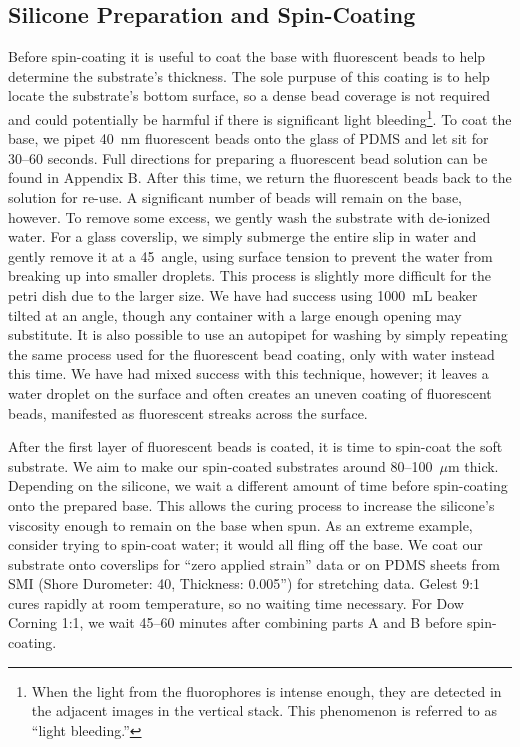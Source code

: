 \subsection{Silicone Preparation and Spin-Coating}
Before spin-coating it is useful to coat the base with fluorescent beads to help determine the substrate's thickness. The sole purpuse of this coating is to help locate the substrate's bottom surface, so a dense bead coverage is not required and could potentially be harmful if there is significant light bleeding\footnote{When the light from the fluorophores is intense enough, they are detected in the adjacent images in the vertical stack. This phenomenon is referred to as ``light bleeding.''}. To coat the base, we pipet 40~nm fluorescent beads onto the glass of PDMS and let sit for 30--60 seconds. Full directions for preparing a fluorescent bead solution can be found in Appendix B. After this time, we return the fluorescent beads back to the solution for re-use. A significant number of beads will remain on the base, however. To remove some excess, we gently wash the substrate with de-ionized water. For a glass coverslip, we simply submerge the entire slip in water and gently remove it at a 45\degree ~angle, using surface tension to prevent the water from breaking up into smaller droplets. This process is slightly more difficult for the petri dish due to the larger size. We have had success using 1000~mL beaker tilted at an angle, though any container with a large enough opening may substitute. It is also possible to use an autopipet for washing by simply repeating the same process used for the fluorescent bead coating, only with water instead this time. We have had mixed success with this technique, however; it leaves a water droplet on the surface and often creates an uneven coating of fluorescent beads, manifested as fluorescent streaks across the surface.

After the first layer of fluorescent beads is coated, it is time to spin-coat the soft substrate. We aim to make our spin-coated substrates around  80--100~$\mu$m thick. Depending on the silicone, we wait a different amount of time before spin-coating onto the prepared base. This allows the curing process to increase the silicone's viscosity enough to remain on the base when spun. As an extreme example, consider trying to spin-coat water; it would all fling off the base. We coat our substrate onto coverslips for ``zero applied strain'' data or on PDMS sheets from SMI (Shore Durometer: 40, Thickness: 0.005'') for stretching data. Gelest 9:1 cures rapidly at room temperature, so no waiting time necessary. For Dow Corning 1:1, we wait 45--60 minutes after combining parts A and B before spin-coating.

